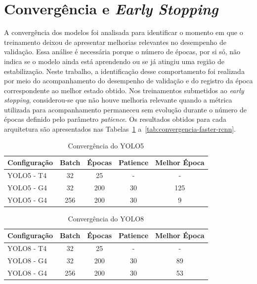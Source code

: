 \section[Convergência e Early Stopping]{Convergência e \textit{Early Stopping}}
\label{sec:convergencia-early-stopping}

A convergência dos modelos foi analisada para identificar o momento em que o treinamento deixou
de apresentar melhorias relevantes no desempenho de validação. Essa análise é necessária porque
o número de épocas, por si só, não indica se o modelo ainda está aprendendo ou se já atingiu
uma região de estabilização. Neste trabalho, a identificação desse comportamento foi realizada
por meio do acompanhamento do desempenho de validação e do registro da época correspondente ao
melhor estado obtido. Nos treinamentos submetidos ao \textit{early stopping}, considerou-se que
não houve melhoria relevante quando a métrica utilizada para acompanhamento permaneceu sem
evolução durante o número de épocas definido pelo parâmetro \textit{patience}. Os resultados
obtidos para cada arquitetura são apresentados nas Tabelas~\ref{tab:convergencia-yolo5}
a~\ref{tab:convergencia-faster-rcnn}.

\begin{table}[H]
    \caption{Convergência do YOLO5}
    \label{tab:convergencia-yolo5}
    \centering
    \small
    \begin{tabular}{lcccc}
        \toprule
        \textbf{Configuração} & \textbf{Batch} & \textbf{Épocas} & \textbf{Patience} & \textbf{Melhor Época} \\
        \midrule
        YOLO5 - T4 & 32  & 25  & -  & -   \\
        YOLO5 - G4 & 32  & 200 & 30 & 125 \\
        YOLO5 - G4 & 256 & 200 & 30 & 9   \\
        \bottomrule
    \end{tabular}
\end{table}
\vspace{-1em}

\begin{table}[H]
    \caption{Convergência do YOLO8}
    \label{tab:convergencia-yolo8}
    \centering
    \small
    \begin{tabular}{lcccc}
        \toprule
        \textbf{Configuração} & \textbf{Batch} & \textbf{Épocas} & \textbf{Patience} & \textbf{Melhor Época} \\
        \midrule
        YOLO8 - T4 & 32  & 25  & -  & -  \\
        YOLO8 - G4 & 32  & 200 & 30 & 89 \\
        YOLO8 - G4 & 256 & 200 & 30 & 53 \\
        \bottomrule
    \end{tabular}
\end{table}
\vspace{-1em}

